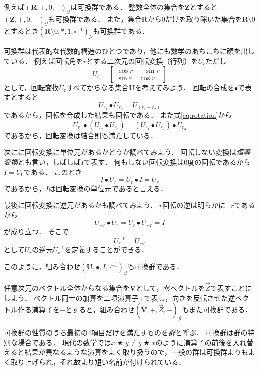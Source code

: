 \documentclass[twocolumn]{jsbook}
\DeclareMathOperator{\mathAnyBinaryOperator}{\bigstar}
\newcommand{\mathSomething}{\square}
\newcommand{\mathSet}[1]{\mathbf{#1}}
\newcommand{\mathVector}[1]{\vec{#1}}
\newcommand{\mathGroup}[4]{(#1,#2,#3,#4)_\mathcal{G}}
\newcommand{\keyword}[1]{\emph{#1}}
\begin{document}
例えば$\mathGroup{\mathSet{R}}{+}{0}{-}$は可換群である．
整数全体の集合を$\mathSet{Z}$とすると$\mathGroup{\mathSet{Z}}{+}{0}{-}$も可換群である．
また，集合$\mathSet{R}$から$0$だけを取り除いた集合を$\mathSet{R}\setminus0$とするとき$\mathGroup{\mathSet{R}\setminus0}{*}{1}{\mathSomething^{-1}}$も可換群である．

可換群は代表的な代数的構造のひとつであり，他にも数学のあちこちに顔を出している．
例えば回転角を$r$とする二次元の回転変換（行列）を$U_r$ただし$$U_r=\begin{bmatrix}\cos r&-\sin r\\\sin r&\cos r\end{bmatrix}$$として，回転変換$U_r$すべてからなる集合$\mathSet{U}$を考えてみよう．
回転の合成を$\bullet$で表すとすると
\begin{equation}
\label{eq:rotation}
U_{r_1}\bullet U_{r_2}=U_{(r_1+r_2)}
\end{equation}
であるから，回転を合成した結果も回転である．
また式\eqref{eq:rotation}から$$U_{r_1}\bullet\left(U_{r_2}\bullet U_{r_3}\right)=\left(U_{r_1}\bullet U_{r_2}\right)\bullet U_{r_3}$$
であるから，回転変換は結合則も満たしている．

次にに回転変換に単位元があるかどうか調べてみよう．
回転しない変換は\keyword{恒等変換}とも言い，しばしば$I$で表す．
何もしない回転変換は$0$度の回転であるから$I=U_0$である．
このとき$$I\bullet U_r=U_r\bullet I=U_r$$であるから，$I$は回転変換の単位元であると言える．

最後に回転変換に逆元があるかも調べてみよう．
$r$回転の逆は明らかに$-r$であるから$$U_{-r}\bullet U_r=U_r\bullet U_{-r}=I$$が成り立つ．
そこで$$U_{r}^{-1}=U_{-r}$$として$U_r$の逆元$U_r^{-1}$を定義することができる．

このように，組み合わせ$\mathGroup{\mathSet{U}}{\bullet}{I}{\mathSomething^{-1}}$も可換群である．

任意次元のベクトル全体からなる集合を$\mathSet{V}$として，零ベクトルを$\mathVector{Z}$で表すことにしよう．
ベクトル同士の加算を二項演算子$+$で表し，向きを反転させた逆ベクトル作る演算子を$-$とすると，組み合わせ$\mathGroup{\mathSet{V}}{+}{\mathVector{Z}}{-}$もまた可換群である．

可換群の性質のうち最初の4項目だけを満たすものを\keyword{群}と呼ぶ．
可換群は群の特別な場合である．
現代の数学では$x\mathAnyBinaryOperator y\neq y\mathAnyBinaryOperator x$のように演算子の前後を入れ替えると結果が異なるような演算をよく取り扱うので，一般の群は可換群よりもよく取り上げられ，それ故より短い名前が付けられている．
\end{document}
